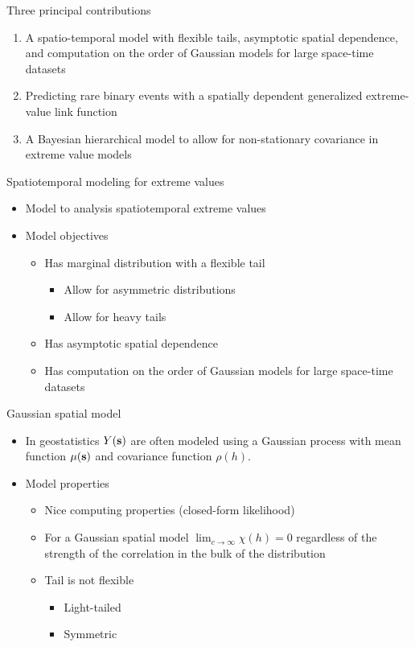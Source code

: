 \documentclass{beamer}
\begin{document}
\begin{frame}{Three principal contributions}
  \begin{enumerate}[1] \setlength{\itemsep}{0.5em}
    \item A spatio-temporal model with flexible tails, asymptotic spatial dependence, and computation on the order of Gaussian models for large space-time datasets
    \item Predicting rare binary events with a spatially dependent generalized extreme-value link function
    \item A Bayesian hierarchical model to allow for non-stationary covariance in extreme value models
  \end{enumerate}
\end{frame}

\begin{frame}{Spatiotemporal modeling for extreme values}
  \begin{itemize} \setlength{\itemsep}{0.5em}
    \item Model to analysis spatiotemporal extreme values
    \item Model objectives
    \begin{itemize}
      \item Has marginal distribution with a flexible tail
      \begin{itemize}
        \item Allow for asymmetric distributions
        \item Allow for heavy tails
      \end{itemize}
      \item Has asymptotic spatial dependence
      \item Has computation on the order of Gaussian models for large space-time datasets
    \end{itemize}
  \end{itemize}
\end{frame}

\begin{frame}{Gaussian spatial model}
  \begin{itemize} \setlength{\itemsep}{0.5em}
    \item In geostatistics $Y(\mbox{\bf s})$ are often modeled using a Gaussian process with mean function $\mu(\mbox{\bf s})$ and covariance function $\rho(h)$.
    \item Model properties
    \begin{itemize}
      \item Nice computing properties (closed-form likelihood)
      \item For a Gaussian spatial model $\lim_{c \rightarrow \infty} \chi(h) = 0$ regardless of the strength of the correlation in the bulk of the distribution
      \item Tail is not flexible
      \begin{itemize}
        \item Light-tailed
        \item Symmetric
      \end{itemize}
    \end{itemize}
  \end{itemize}
\end{frame}
\end{document}
